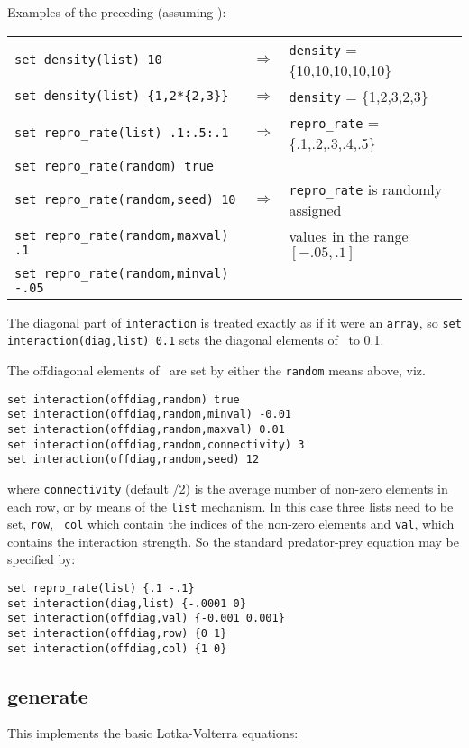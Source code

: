 Examples of the preceding (assuming ):

\begin{tabular}{lcl}
\verb|set density(list) 10| &$\Longrightarrow$& \verb|density| =
\{10,10,10,10,10\}\\
\verb|set density(list) {1,2*{2,3}}| &$\Longrightarrow$& \verb|density| =
\{1,2,3,2,3\}\\
\verb|set repro_rate(list) .1:.5:.1| &$\Longrightarrow$& \verb|repro_rate|
= \{.1,.2,.3,.4,.5\}\\
\verb|set repro_rate(random) true|\\
\verb|set repro_rate(random,seed) 10|&$\Longrightarrow$&
        \verb|repro_rate| is randomly assigned\\
\verb|set repro_rate(random,maxval) .1| & & values in the range $[-.05,.1]$\\
\verb|set repro_rate(random,minval) -.05| 
\end{tabular}

The diagonal part of \verb|interaction| is treated exactly as if it
were an \verb|array|, so \verb|set interaction(diag,list) 0.1| sets
the diagonal elements of \bbeta\ to 0.1.

The offdiagonal elements of \bbeta\ are set by either the
\verb|random| means above, viz.
\begin{verbatim}
set interaction(offdiag,random) true
set interaction(offdiag,random,minval) -0.01
set interaction(offdiag,random,maxval) 0.01
set interaction(offdiag,random,connectivity) 3
set interaction(offdiag,random,seed) 12
\end{verbatim}
where \verb|connectivity| (default \nsp/2) is the average number of
non-zero elements in each row, or by means of the \verb|list|
mechanism. In this case three lists need to be set, \verb|row|, {\tt
col} which contain the indices of the non-zero elements and
\verb|val|, which contains the interaction strength. So the standard
predator-prey equation may be specified by:
\begin{verbatim}
set repro_rate(list) {.1 -.1}
set interaction(diag,list) {-.0001 0}
set interaction(offdiag,val) {-0.001 0.001}
set interaction(offdiag,row) {0 1}
set interaction(offdiag,col) {1 0}
\end{verbatim}

\subsection{generate}

This implements the basic Lotka-Volterra equations:

